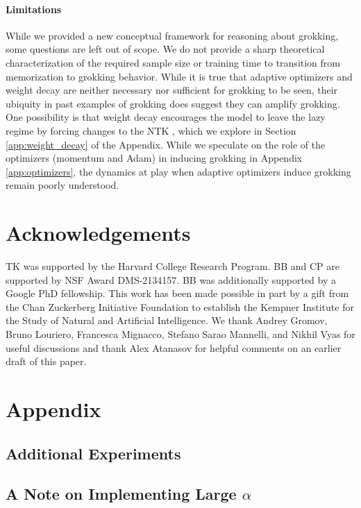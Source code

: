 \documentclass{article} %
\begin{document}
\paragraph{Limitations} While we provided a new conceptual framework for reasoning about grokking, some questions are left out of scope. We do not provide a sharp theoretical characterization of the required sample size or training time to transition from memorization to grokking behavior. While it is true that adaptive optimizers and weight decay are neither necessary nor sufficient for grokking to be seen, their ubiquity in past examples of grokking does suggest they can amplify grokking. One possibility is that weight decay encourages the model to leave the lazy regime by forcing changes to the NTK \citep{lewkowycz2020training}, which we explore in Section \ref{app:weight_decay} of the Appendix. While we speculate on the role of the optimizers (momentum and Adam) in inducing grokking in Appendix \ref{app:optimizers}, the dynamics at play when adaptive optimizers induce grokking remain poorly understood. 


\newpage 

\section*{Acknowledgements}
TK was supported by the Harvard College Research Program. BB and CP are supported by NSF Award
DMS-2134157. BB was additionally supported by a Google PhD fellowship. This work has been made possible in part by a gift from the Chan Zuckerberg Initiative Foundation to establish the Kempner Institute for the Study of Natural and Artificial Intelligence. We thank Andrey Gromov, Bruno Louriero, Francesca Mignacco, Stefano Sarao Mannelli, and
Nikhil Vyas for useful discussions and thank Alex Atanasov for helpful comments on an earlier draft of this
paper.




\newpage 
\section{Appendix}


\subsection*{Additional Experiments}

\subsection{A Note on Implementing Large $\alpha$}
\end{document}
